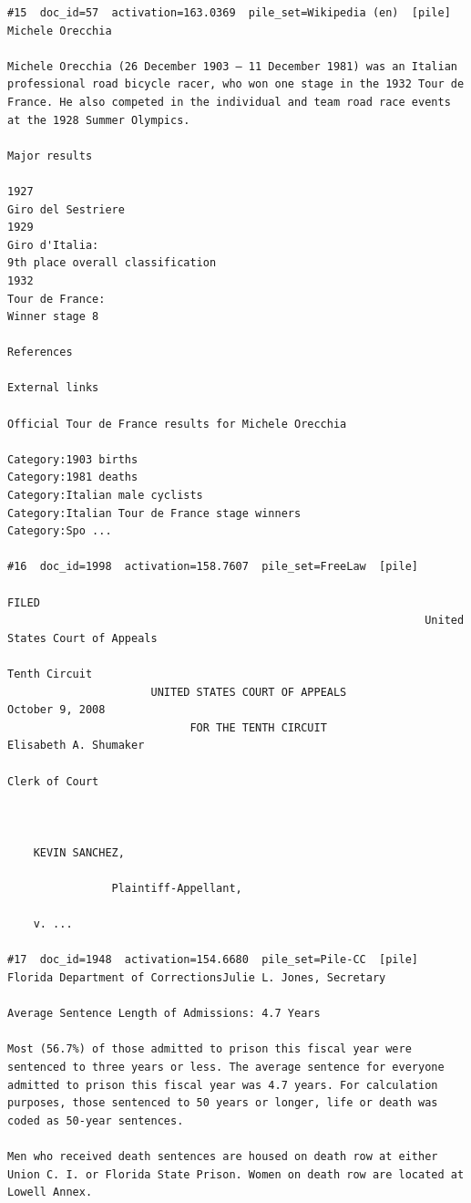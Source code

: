 \begin{verbatim}
#15  doc_id=57  activation=163.0369  pile_set=Wikipedia (en)  [pile]
Michele Orecchia

Michele Orecchia (26 December 1903 – 11 December 1981) was an Italian professional road bicycle racer, who won one stage in the 1932 Tour de France. He also competed in the individual and team road race events at the 1928 Summer Olympics.

Major results

1927
Giro del Sestriere
1929
Giro d'Italia:
9th place overall classification
1932
Tour de France:
Winner stage 8

References

External links

Official Tour de France results for Michele Orecchia

Category:1903 births
Category:1981 deaths
Category:Italian male cyclists
Category:Italian Tour de France stage winners
Category:Spo ...

#16  doc_id=1998  activation=158.7607  pile_set=FreeLaw  [pile]
                                                                            FILED
                                                                United States Court of Appeals
                                                                        Tenth Circuit
                      UNITED STATES COURT OF APPEALS                  October 9, 2008
                            FOR THE TENTH CIRCUIT                   Elisabeth A. Shumaker
                                                                        Clerk of Court



    KEVIN SANCHEZ,

                Plaintiff-Appellant,

    v. ...

#17  doc_id=1948  activation=154.6680  pile_set=Pile-CC  [pile]
Florida Department of CorrectionsJulie L. Jones, Secretary

Average Sentence Length of Admissions: 4.7 Years

Most (56.7%) of those admitted to prison this fiscal year were sentenced to three years or less. The average sentence for everyone admitted to prison this fiscal year was 4.7 years. For calculation purposes, those sentenced to 50 years or longer, life or death was coded as 50-year sentences.

Men who received death sentences are housed on death row at either Union C. I. or Florida State Prison. Women on death row are located at Lowell Annex.


\end{verbatim}
